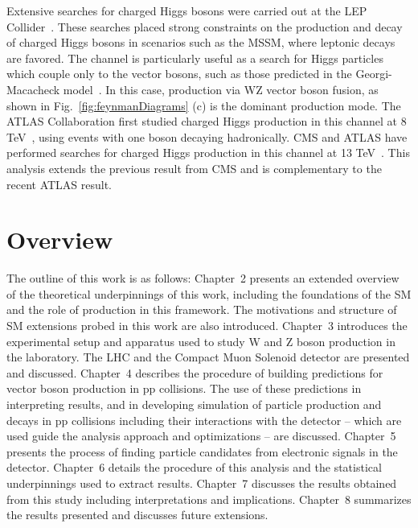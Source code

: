 Extensive searches for charged Higgs bosons were carried out at the 
LEP Collider~\cite{ALEPHCollaboration2013}. 
These searches placed strong constraints on the production
and decay of charged Higgs bosons in scenarios such as the MSSM, where leptonic
decays are favored. 
The \WZjj channel is particularly useful as a search for Higgs particles 
which couple only to the vector bosons, such as those predicted in the 
Georgi-Macacheck model~\cite{Georgi:1985nv}. In this case, production via WZ vector
boson fusion, as shown in Fig.~\ref{fig:feynmanDiagrams} (c) is the dominant 
production mode.
The ATLAS Collaboration first studied charged Higgs production in this channel
at 8 TeV~\cite{Aad:2015nfa}, using events with one boson decaying hadronically.
CMS and ATLAS have performed searches for charged Higgs production in this channel 
at 13 TeV~\cite{Sirunyan:2017sbn,Aaboud:2018ohp}. This analysis extends the previous result from CMS and is complementary
to the recent ATLAS result.

\section{Overview}

The outline of this work is as follows: Chapter~2 presents an extended 
overview of the theoretical underpinnings of this work, including the foundations
of the SM and the role of \EWWZ production in this framework. The motivations 
and structure of SM extensions probed in this work are also introduced.
Chapter~3 introduces the experimental setup and apparatus used to study W and 
Z boson production in the laboratory. The LHC and the Compact Muon Solenoid 
detector are presented and discussed. Chapter~4 describes the procedure of 
building predictions for vector boson production in pp collisions.
The use of these predictions in interpreting results, and in developing simulation
of particle production and decays in pp collisions including their interactions
with the detector -- which are used 
guide the analysis approach and optimizations -- are discussed. Chapter~5 presents
the process of finding particle candidates from electronic signals in the detector.
Chapter~6 details the procedure of this analysis and the statistical underpinnings
used to extract results. Chapter~7 discusses the results obtained from this study
including interpretations and implications. Chapter~8 summarizes the
results presented and discusses future extensions.
